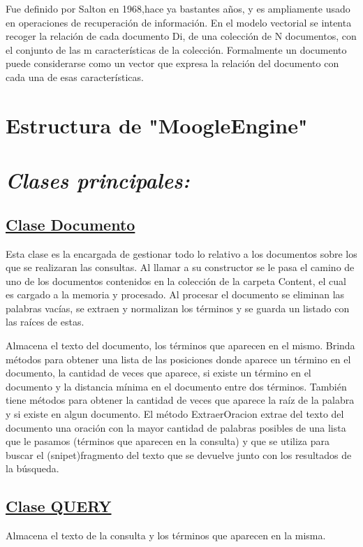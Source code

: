 \documentclass{article}%
\begin{document}
Fue definido por Salton en 1968,hace ya bastantes años, y es ampliamente usado en operaciones de recuperación de información. En el modelo vectorial se intenta recoger la relación de cada documento Di, de una colección de N documentos, con el conjunto de las m características de la colección. Formalmente un documento puede considerarse como un vector que expresa la relación del documento con cada una de esas características.

\section*{Estructura de "MoogleEngine"}

\section{\emph{Clases principales:}}

\subsection{\underline{Clase Documento}}
Esta clase es la encargada de gestionar todo lo relativo a los documentos sobre los que se realizaran las consultas. Al llamar a su constructor se le pasa el camino de uno de los documentos contenidos en la colección de la carpeta Content, el cual es cargado a la memoria y procesado. Al procesar el documento se eliminan las palabras vacías, se extraen y normalizan los términos y se guarda un listado con las raíces de estas.

Almacena el texto del documento, los términos que aparecen en el mismo. Brinda métodos para obtener una lista de las posiciones donde aparece un término en el documento, la cantidad de veces que aparece, si existe un término en el documento y la distancia mínima en el documento entre dos términos. También tiene métodos para obtener la cantidad de veces que aparece la raíz de la palabra y si existe en algun documento. El método ExtraerOracion extrae del texto del documento una oración con la mayor cantidad de palabras posibles de una lista que le pasamos (términos que
aparecen en la consulta) y que se utiliza para buscar el (snipet)fragmento del texto que se devuelve junto con los resultados de la búsqueda.
\subsection{\underline{Clase QUERY}}
Almacena el texto de la consulta y los términos que aparecen en la misma.
\end{document}
